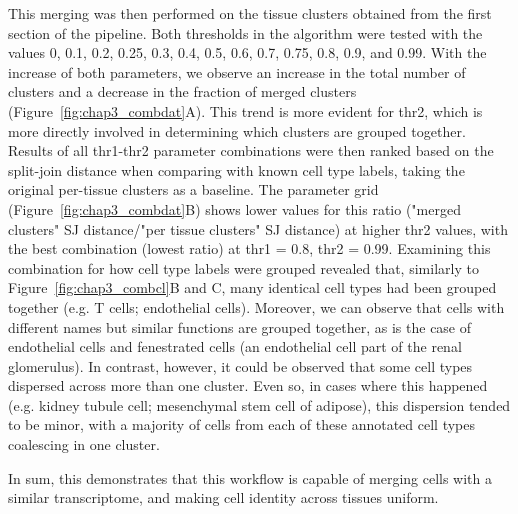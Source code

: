 This merging was then performed on the tissue clusters obtained from the first section of the pipeline. Both thresholds in the algorithm were tested with the values 0, 0.1, 0.2, 0.25, 0.3, 0.4, 0.5, 0.6, 0.7, 0.75, 0.8, 0.9, and 0.99. With the increase of both parameters, we observe an increase in the total number of clusters and a decrease in the fraction of merged clusters (Figure~\ref{fig:chap3_combdat}A). This trend is more evident for thr2, which is more directly involved in determining which clusters are grouped together. Results of all thr1-thr2 parameter combinations were then ranked based on the split-join distance when comparing with known cell type labels, taking the original per-tissue clusters as a baseline. The parameter grid (Figure~\ref{fig:chap3_combdat}B) shows lower values for this ratio ("merged clusters" SJ distance/"per tissue clusters" SJ distance) at higher thr2 values, with the best combination (lowest ratio) at thr1 = 0.8, thr2 = 0.99. Examining this combination for how cell type labels were grouped revealed that, similarly to Figure~\ref{fig:chap3_combcl}B and C, many identical cell types had been grouped together (e.g. T cells; endothelial cells). Moreover, we can observe that cells with different names but similar functions are grouped together, as is the case of endothelial cells and fenestrated cells (an endothelial cell part of the renal glomerulus). In contrast, however, it could be observed that some cell types dispersed across more than one cluster. Even so, in cases where this happened (e.g. kidney tubule cell; mesenchymal stem cell of adipose), this dispersion tended to be minor, with a majority of cells from each of these annotated cell types coalescing in one cluster.

In sum, this demonstrates that this workflow is capable of merging cells with a similar transcriptome, and making cell identity across tissues uniform.


